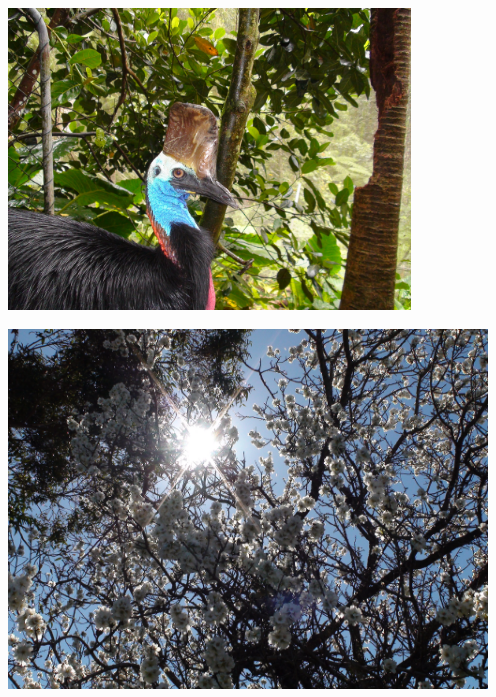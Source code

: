 \documentclass[12pt]{article}
\begin{document}
\begin{center}
\includegraphics[width=0.8\textwidth]{bird}
\end{center}

\begin{center}
\includegraphics[width=5in]{tree}
\end{center}
\end{document}
